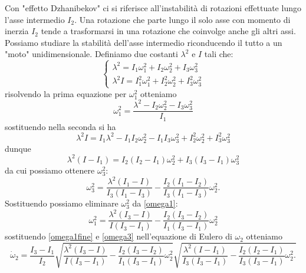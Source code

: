     Con "effetto Dzhanibekov" ci si riferisce all'instabilità di rotazioni effettuate lungo l'asse intermedio $I_2$. Una rotazione che parte lungo il solo asse con momento di inerzia $I_2$ tende a trasformarsi in una rotazione che coinvolge anche gli altri assi. Possiamo studiare la stabilità dell'asse intermedio riconducendo il tutto a un "moto" unidimensionale. Definiamo due costanti $\lambda^2$ e $I$ tali che:
    \begin{equation}
        \begin{cases}
            \lambda^2 = I_1\omega_1^2+I_2\omega_2^2+I_3\omega_3^2\\
            \lambda^2I = I_1^2\omega_1^2+I_2^2\omega_2^2+I_3^2\omega_3^2
        \end{cases}
    \end{equation}
    risolvendo la prima equazione per $\omega_1^2$ otteniamo
    \begin{equation}
        \omega_1^2 = \frac{\lambda^2-I_2\omega_2^2-I_3\omega_3^2}{I_1}
        \label{omega1}
    \end{equation}
    sostituendo nella seconda si ha
    \begin{equation}
        \lambda^2I = I_1\lambda^2-I_1I_2\omega_2^2-I_1I_3\omega_3^2+I^2_2\omega_2^2+I^2_3\omega_3^2
    \end{equation}
    dunque
    \begin{equation}
        \lambda^2(I-I_1) =I_2(I_2-I_1)\omega_2^2 + I_3(I_3-I_1)\omega_3^2 
    \end{equation}
    da cui possiamo ottenere $\omega_3^2$:
    \begin{equation}
        \omega_3^2 = \frac{\lambda^2(I_1-I)}{I_3(I_1-I_3)}-\frac{I_2(I_1-I_2)}{I_3(I_1-I_3)}\omega_2^2.
        \label{omega3}
    \end{equation}
    Sostituendo possiamo eliminare $\omega_3^2$ da \eqref{omega1}:
    \begin{equation}
        \omega_1^2 = \frac{\lambda^2(I_3-I)}{I(I_3-I_1)}-\frac{I_2(I_3-I_2)}{I_1(I_3-I_1)}\omega_2^2
        \label{omega1fine}
    \end{equation}
    sostituendo \eqref{omega1fine} e \eqref{omega3} nell'equazione di Eulero di $\omega_2$ otteniamo
    \begin{equation}
        \dot{\omega}_2 = \frac{I_3-I_1}{I_2}\sqrt{\frac{\lambda^2(I_3-I)}{I(I_3-I_1)}-\frac{I_2(I_3-I_2)}{I_1(I_3-I_1)}\omega_2^2}\sqrt{\frac{\lambda^2(I-I_1)}{I_3(I_3-I_1)}-\frac{I_2(I_2-I_1)}{I_3(I_3-I_1)}\omega_2^2.}
    \end{equation}
